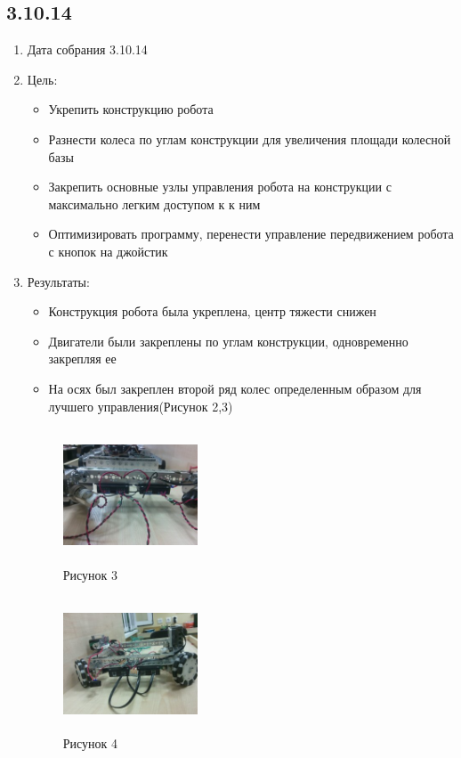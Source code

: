 \documentclass[12pt]{article}
\begin{document}
	\subsection{3.10.14}
		\begin{enumerate}
			\item Дата собрания 3.10.14
			\item Цель:
				\begin{itemize}
					\item Укрепить конструкцию робота
					\item Разнести колеса по углам конструкции для увеличения площади колесной базы
					\item Закрепить основные узлы управления робота на конструкции с максимально легким доступом к к ним
					\item Оптимизировать программу, перенести управление передвижением робота с кнопок на джойстик
				\end{itemize}
			\item Результаты:
				\begin{itemize}
					\item Конструкция робота была укреплена, центр тяжести снижен 
					\item Двигатели были закреплены по углам конструкции, одновременно закрепляя ее
					\item На осях был закреплен второй ряд колес определенным образом для лучшего управления(Рисунок 2,3)
				\end{itemize}
			\begin{figure} [h]
				\centering
				\begin{minipage}{0.3\linewidth}
					\includegraphics[width=40mm,height=40mm]{3_1_robot}\\ Рисунок 3
				\end{minipage}
				\begin{minipage}{0.3\linewidth}
					\includegraphics[width=40mm,height=40mm]{3_2_robot}\\ Рисунок 4

\end{minipage}
\end{figure}
\end{enumerate}
\end{document}

